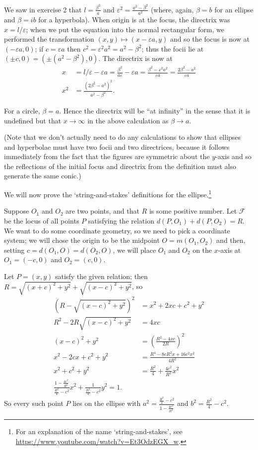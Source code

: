 \documentclass[a4paper,leqno,10pt]{article}
\theoremstyle{exercise}
\theoremstyle{plain}
\theoremstyle{definition}
\theoremstyle{remark}
\begin{document}
We saw in exercise 2 that $ l = \frac{\beta^2}{a} $ and $ \varepsilon^2 = \frac{a^2 - \beta^2}{a^2} $ (where, again, $ \beta = b $ for an ellipse
and $ \beta = ib $ for a hyperbola). When origin is at the focus, the directrix was $ x = l/\varepsilon $; when we put the equation into the
normal rectangular form, we performed the transformation $ (x,y) \mapsto (x - \varepsilon a, y) $ and so the focus is now at $ (-\varepsilon a, 0) $;
if $ c = \varepsilon a $ then $ c^2 = \varepsilon^2 a^2 = a^2 - \beta^2 $; thus the focii lie at $ (\pm c, 0) = (\pm(a^2 - \beta^2), 0) $. The
directrix is now at
\begin{align*}
  x &= l/\varepsilon - \varepsilon a = \frac{\beta^2}{a\varepsilon} - \varepsilon a = \frac{\beta^2 - \varepsilon^2 a^2}{\varepsilon a}
     = \frac{2\beta^2 - a^2}{\varepsilon a}\\
  x^2 &= \frac{(2\beta^2 - a^2)^2}{a^2 - \beta^2}.
\end{align*}

For a circle, $ \beta = a $. Hence the directrix will be ``at infinity'' in the sense that it is undefined but that $ x \to \infty $ in the above
calculation as $ \beta \to a $.

(Note that we don't actually need to do any calculations to show that ellipses and hyperbolae must have two focii and two directrices, because it
follows immediately from the fact that the figures are symmetric about the $ y$-axis and so the reflections of the initial focus and directrix from
the definition must also generate the same conic.)

We will now prove the `string-and-stakes' definitions for the ellipse.\footnote{For an explanation of the name `string-and-stakes',
see \url{https://www.youtube.com/watch?v=Et3OdzEGX_w}.}

Suppose $ O_1 $ and $ O_2 $ are two points, and that $ R $ is some positive number. Let $ \mathcal{F} $ be the locus of all points $ P $
satisfying the relation $ d(P,O_1) + d(P,O_2) = R $. We want to do some coordinate geometry, so we need to pick a coordinate system; we will
chose the origin to be the midpoint $ O = m(O_1, O_2) $ and then, setting $ c = d(O_1, O) = d(O_2, O) $, we will place $ O_1 $ and $ O_2 $
on the $ x$-axis at $ O_1 = (-c, 0) $ and $ O_2 = (c,0) $.

Let $ P = (x,y) $ satisfy the given relation; then $ R = \sqrt{(x + c)^2 + y^2} + \sqrt{(x - c)^2 + y^2} $, so
\begin{align*}
  (R - \sqrt{(x - c)^2 + y^2})^2 &= x^2 + 2xc + c^2 + y^2\\
  R^2 - 2R\sqrt{(x - c)^2 + y^2} &= 4xc\\
  (x - c)^2 + y^2 &= \left(\frac{R^2 - 4xc}{2R}\right)^2\\
  x^2 - 2cx + c^2 + y^2 &= \frac{R^4 - 8cR^2x + 16c^2x^2}{4R^2}\\
  x^2 + c^2 + y^2 &=  \frac{R^2}{4} + \frac{4c^2}{R^2}x^2\\
  \frac{1 - \frac{4c^2}{R^2}}{\frac{R^2}{4} - c^2} x^2 + \frac{1}{\frac{R^2}{4} - c^2}y^2 = 1.
\end{align*}
So every such point $ P $ lies on the ellipse with $ a^2 = \frac{\frac{R^2}{4} - c^2}{1 - \frac{4c^2}{R^2}} $ and $ b^2 = \frac{R^2}{4} - c^2 $.
\end{document}
